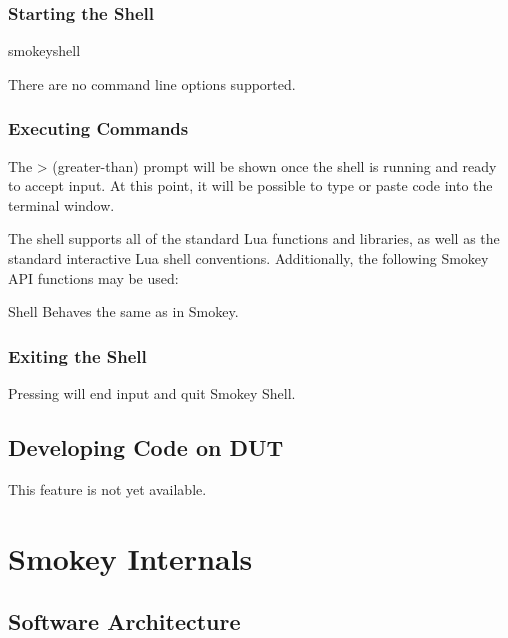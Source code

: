 \subsubsection{Starting the Shell}

\begin{CommandLine}
smokeyshell
\end{CommandLine}

There are no command line options supported.

\subsubsection{Executing Commands}

The > (greater-than) prompt will be shown once the shell is running and ready
to accept input.  At this point, it will be possible to type or paste code into
the terminal window.

The shell supports all of the standard Lua functions and libraries, as well as
the standard interactive Lua shell conventions.  Additionally, the following
Smokey API functions may be used:

\begin{Definition}

\item[Shell] Behaves the same as in Smokey.

\end{Definition}

\subsubsection{Exiting the Shell}

Pressing \KeyCapsCtrlD{} will end input and quit Smokey Shell.

\subsection{Developing Code on DUT}

This feature is not yet available.


\section{Smokey Internals}

\subsection{Software Architecture}

